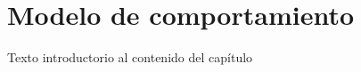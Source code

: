 
\pagebreak
\chapter{Modelo de comportamiento}

	Texto introductorio al contenido del capítulo

	
	
	


